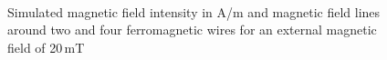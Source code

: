 \begin{figure}
            \begin{subfigure}{0.49\textwidth}
                  \flushleft
          \end{subfigure}\hfill
        \begin{subfigure}{0.49\textwidth}
                \flushright
        \end{subfigure}
        \\
        
        \caption[Simulated magnetic field intensity around two and four wires]{Simulated magnetic field intensity in A/m and magnetic field lines around two and four ferromagnetic wires for an external magnetic field of 20\,mT}
        \label{fig:tw_fw_mag_field}
  \end{figure}

